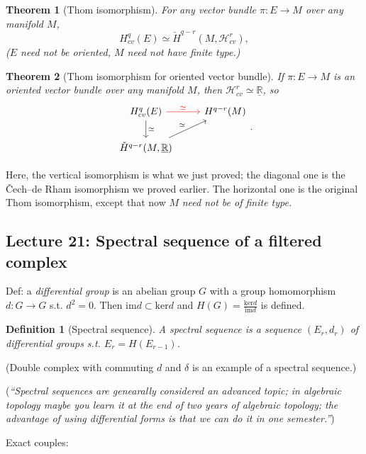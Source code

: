 \documentclass{article}
\theoremstyle{mystyle}
\newtheorem*{definition}{Definition}%
\newtheorem*{theorem*}{Theorem}
\theoremstyle{remark}
\numberwithin{equation}{section}
\begin{document}
\begin{theorem*}[Thom isomorphism] For any vector bundle $\pi\colon E\rightarrow M$ over any manifold $M$,
\begin{equation}
H^q_{cv}(E) \simeq \check{H}^{q-r}(M,\mathcal{H}^r_{cv}),
\end{equation}
($E$ need not be oriented, $M$ need not have finite type.)
\end{theorem*}

\begin{theorem*}[Thom isomorphism for oriented vector bundle] If $\pi\colon E\rightarrow M$ is an oriented vector bundle over any manifold $M$, then $\mathcal{H}^r_{cv} \simeq \underline{\mathbb{R}}$, so
$$
\begin{tikzcd}
H^q_{cv}(E) \ar[r,red,"\simeq"]\ar[d,"\simeq"] & H^{q-r}(M)\\
\check{H}^{q-r}(M,\underline{\mathbb{R}})\ar[ur,"\simeq"] &
\end{tikzcd}.
$$
\end{theorem*}
Here, the vertical isomorphism is what we just proved; the diagonal one is the Čech--de Rham isomorphism we proved earlier. The horizontal one is the original Thom isomorphism, except that now $M$ \emph{need not be of finite type.}




\subsection{Lecture 21: Spectral sequence of a filtered complex}

Def: a \emph{differential group} is an abelian group $G$ with a group homomorphism $d\colon G\rightarrow G$ s.t. $d^2 = 0$. Then $\mathrm{im}d\subset \mathrm{ker}d$ and $H(G) = \frac{\mathrm{ker}d}{\mathrm{im}d}$ is defined.

\begin{definition}[Spectral sequence]
A \emph{spectral sequence} is a sequence $(E_r,d_r)$ of differential groups s.t. $E_r = H(E_{r-1})$. 
\end{definition}

(Double complex with commuting $d$ and $\delta$ is an example of a spectral sequence.)

(\emph{``Spectral sequences are genearally considered an advanced topic; in algebraic topology maybe you learn it at the end of two years of algebraic topology; the advantage of using differential forms is that we can do it in one semester.''})

Exact couples:
\end{document}
